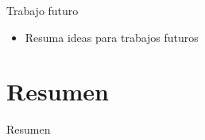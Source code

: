 \documentclass[15pt]{beamer} %
\begin{document}
\begin{frame}{Trabajo futuro}
  
  \begin{itemize}
  \item Resuma ideas para trabajos futuros
  \end{itemize}
  
\end{frame}


\section{Resumen}

\begin{frame}{Resumen}
  \tableofcontents
\end{frame}
\end{document}

